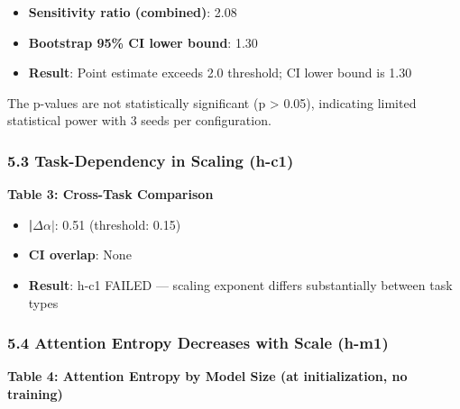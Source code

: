 \begin{itemize}
\item \textbf{Sensitivity ratio (combined)}: 2.08
\item \textbf{Bootstrap 95\% CI lower bound}: 1.30
\item \textbf{Result}: Point estimate exceeds 2.0 threshold; CI lower bound is 1.30
\end{itemize}

The p-values are not statistically significant (p > 0.05), indicating limited statistical power with 3 seeds per configuration.

\subsubsection{5.3 Task-Dependency in Scaling (h-c1)}

\textbf{Table 3: Cross-Task Comparison}

\begin{table}[htbp]
\centering
{}
\end{table}

\begin{itemize}
\item \textbf{|$\Delta \alpha |$}: 0.51 (threshold: 0.15)
\item \textbf{CI overlap}: None
\item \textbf{Result}: h-c1 FAILED --- scaling exponent differs substantially between task types
\end{itemize}

\subsubsection{5.4 Attention Entropy Decreases with Scale (h-m1)}

\textbf{Table 4: Attention Entropy by Model Size (at initialization, no training)}

\begin{table}[htbp]
\centering
{}
\end{table}


